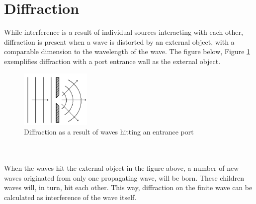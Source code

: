 \section{Diffraction}
While interference is a result of individual sources
interacting with each other, diffraction is present when a wave is distorted by an external object, with a comparable dimension to the wavelength of the wave. The figure below, Figure \ref{fig:diffraction} exemplifies diffraction with a port entrance wall as the external object. 
\begin{figure}[h]
    \centering
    \includegraphics[width=0.3\textwidth]{Images/theory/diffraction.png}
    \caption{Diffraction as a result of waves hitting an entrance port}
    \label{fig:diffraction}
\end{figure}
\\\\
When the waves hit the external object in the figure above, a number of new waves originated from only one propagating wave, will be born. These children waves will, in turn, hit each other. This way, diffraction on the finite wave can be calculated as interference of the wave itself.



